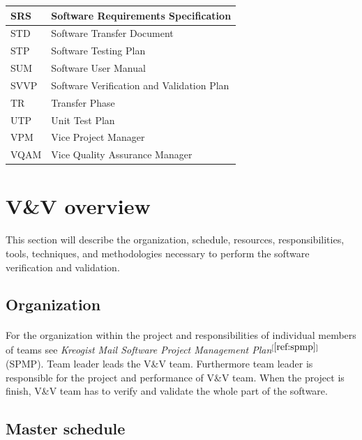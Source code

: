 \documentclass[11pt,a4paper]{article}
\begin{document}
\begin{center}
\begin{longtable}{|p{3cm}|p{9.1cm}|}
            \hline
            SRS         & Software Requirements Specification  \\
            \hline
            STD         & Software Transfer Document  \\
            \hline
            STP         & Software Testing Plan \\
            \hline
            SUM         & Software User Manual  \\
            \hline
            SVVP        & Software Verification and Validation Plan \\
            \hline
            TR          & Transfer Phase  \\
            \hline
            UTP         & Unit Test Plan  \\
            \hline
            VPM         & Vice Project Manager  \\
            \hline
            VQAM        & Vice Quality Assurance Manager
        \end{longtable}
    \end{center}
    \section{V\&V overview}
        \paragraph{} This section will describe the organization, schedule, resources, responsibilities, tools, techniques, and methodologies necessary to perform the software verification and validation.
        \subsection{Organization}
            \paragraph{} For the organization within the project and responsibilities of individual members of teams see \emph{Kreogist Mail Software Project Management Plan}$^{[\ref{ref:spmp}]}$ (SPMP). Team leader leads the V\&V team. Furthermore team leader is responsible for the project and performance of V\&V team. When the project is finish, V\&V team has to verify and validate the whole part of the software.
        \subsection{Master schedule}\label{section:tasks}
\end{document}
